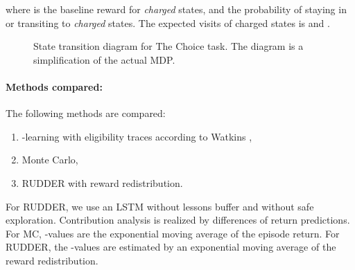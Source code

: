 \documentclass{article}
\begin{document}
\begin{appendices}
where  is the baseline reward for {\em charged} states, 
and  the probability of staying in or transiting to {\em charged} states.
The expected visits of charged states is  and
.

\begin{figure}
\centering
{}
\caption{State transition diagram for The Choice task. 
The diagram is a simplification of the actual MDP.}
\end{figure}


\paragraph{Methods compared: }
The following methods are compared:
\begin{enumerate}
    \item -learning with eligibility traces according to Watkins \cite{Watkins:89}, 
   \item Monte Carlo,
    \item RUDDER with reward redistribution.
\end{enumerate}


For RUDDER, we use an LSTM without lessons buffer 
and without safe exploration. 
Contribution analysis is realized by differences of return predictions.
For MC, -values are the exponential moving average of the episode return.
For RUDDER, the -values are estimated by an exponential moving average of the reward redistribution.



\end{appendices}
\end{document}
